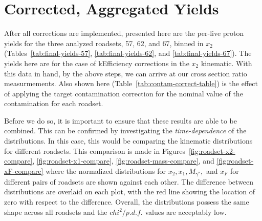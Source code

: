 \section{Corrected, Aggregated Yields}

After all corrections are implemented, presented here are the per-live proton yields for the three analyzed roadsets, 57, 62, and 67, binned in $x_2$ (Tables~\ref{tab:final-yields-57}, \ref{tab:final-yields-62}, and \ref{tab:final-yields-67}).  The yields here are for the case of kEfficiency corrections in the $x_2$ kinematic. With this data in hand, by the above steps, we can arrive at our cross section ratio measurmements. Also shown here (Table~\ref{tab:contam-correct-table}) is the effect of applying the target contamination correction for the nominal value of the contamination for each roadset.

Before we do so, it is important to ensure that these results are able to be combined. This can be confirmed by investigating the \emph{time-dependence} of the distributions. In this case, this would be comparing the kinematic distributions for different roadsets. This comparison is made in Figures~\ref{fig:roadset-x2-compare}, \ref{fig:roadset-x1-compare}, \ref{fig:roadset-mass-compare}, and \ref{fig:roadset-xF-compare} where the normalized distributions for $x_2, x_1, M_{\gamma^*},$ and $x_F$ for different pairs of roadsets are shown against each other. The difference between distributions are overlaid on each plot, with the red line showing the location of zero with respect to the difference. Overall, the distributions possess the same shape across all roadsets and the $chi^2/p.d.f.$ values are acceptably low. 

